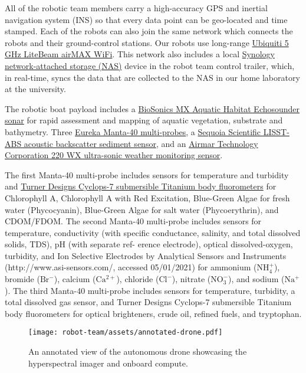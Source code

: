 All of the robotic team members carry a high-accuracy GPS and inertial navigation system (INS) so that every data point can be geo-located and time stamped. Each of the robots can also join the same network which connects the robots and their ground-control stations. Our robots use long-range \href{https://www.ui.com}{Ubiquiti 5 GHz LiteBeam airMAX WiFi}. This network also includes a local \href{https://www.synology.com}{Synology network-attached storage (NAS)} device in the robot team control trailer, which, in real-time, syncs the data that are collected to the NAS in our home laboratory at the university. 

The robotic boat payload includes a \href{https://www.biosonicsinc.com/products/mx-aquatic-habitat-echosounder/}{BioSonics MX Aquatic Habitat Echosounder sonar} for rapid assessment and mapping of aquatic vegetation, substrate and bathymetry. Three \href{https://www.waterprobes.com/multiprobes-and-sondes-for-monitori}{Eureka Manta-40 multi-probes}, a \href{https://www.sequoiasci.com/product/lisst-abs/}{Sequoia Scientific LISST-ABS acoustic backscatter sediment sensor}, and an \href{https://www.airmar.com/weather-description.html?id=153}{Airmar Technology Corporation 220 WX ultra-sonic weather monitoring sensor}.

The first Manta-40 multi-probe includes sensors for temperature and turbidity and \href{https://www.turnerdesigns.com/cyclops-7f-submersible-fluorometer}{Turner Designs Cyclops-7 submersible Titanium body fluorometers} for Chlorophyll A, Chlorophyll A with Red Excitation, Blue-Green Algae for fresh water (Phycocyanin), Blue-Green Algae for salt water (Phycoerythrin), and CDOM/FDOM. The second Manta-40 multi-probe includes sensors for temperature, conductivity (with specific conductance, salinity, and total dissolved solids, TDS), pH (with separate ref-
erence electrode), optical dissolved-oxygen, turbidity, and Ion Selective Electrodes by Analytical Sensors and Instruments (http://www.asi-sensors.com/, accessed 05/01/2021)
for ammonium ($\mathrm{NH_4^+}$), bromide ($\mathrm{Br^−}$), calcium ($\mathrm{Ca^{2+}}$), chloride ($\mathrm{Cl^−}$), nitrate ($\mathrm{NO_3^{-}}$), and sodium ($\mathrm{Na^+}$). The third Manta-40 multi-probe includes sensors for temperature, turbidity, a total dissolved gas sensor, and Turner Designs Cyclops-7 submersible Titanium body fluorometers for optical brighteners, crude oil, refined fuels, and tryptophan.

\begin{figure}[!hbt]
  \centering
  \texttt{[image: robot-team/assets/annotated-drone.pdf]}
  \caption{An annotated view of the autonomous drone showcasing the hyperspectral imager and onboard compute.}
  \label{fig:uav-closeup}
\end{figure}


